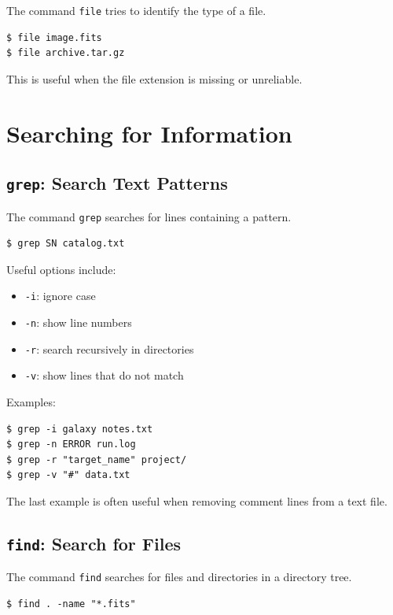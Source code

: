 The command \texttt{file} tries to identify the type of a file.

\begin{lstlisting}
$ file image.fits
$ file archive.tar.gz
\end{lstlisting}

This is useful when the file extension is missing or unreliable.

\section{Searching for Information}

\subsection{\texttt{grep}: Search Text Patterns}

The command \texttt{grep} searches for lines containing a pattern.

\begin{lstlisting}
$ grep SN catalog.txt
\end{lstlisting}

Useful options include:

\begin{itemize}
\item \texttt{-i}: ignore case
\item \texttt{-n}: show line numbers
\item \texttt{-r}: search recursively in directories
\item \texttt{-v}: show lines that do not match
\end{itemize}

Examples:

\begin{lstlisting}
$ grep -i galaxy notes.txt
$ grep -n ERROR run.log
$ grep -r "target_name" project/
$ grep -v "#" data.txt
\end{lstlisting}

The last example is often useful when removing comment lines from a text file.

\subsection{\texttt{find}: Search for Files}

The command \texttt{find} searches for files and directories in a directory tree.

\begin{lstlisting}
$ find . -name "*.fits"
\end{lstlisting}

